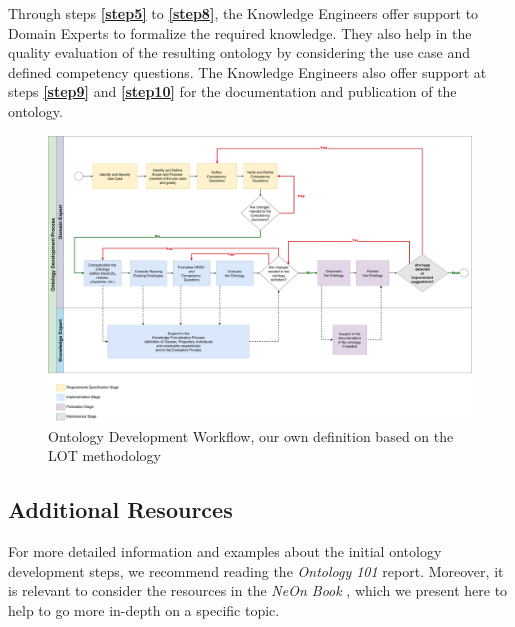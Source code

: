\documentclass{guideline/sty/rapport}
\begin{document}
\begin{beware}[Remark]
Through steps \textbf{\ref{step5}} to \textbf{\ref{step8}}, the Knowledge Engineers offer support to Domain Experts to formalize the required knowledge. They also help in the quality evaluation of the resulting ontology by considering the use case and defined competency questions.
The Knowledge Engineers also offer support at steps \textbf{\ref{step9}} and \textbf{\ref{step10}} for the documentation and publication of the ontology.
\end{beware}


\begin{figure}
    \centering
      \includegraphics[width=1\textwidth]{images/adaptedworkflow.pdf}
      \caption{Ontology Development Workflow, our own definition based on the LOT methodology \cite{Poveda22}}
    \label{fig:workflowsuggestion}
\end{figure}

\subsection{Additional Resources} \label{sec:additionalresources}
For more detailed information and examples about the initial ontology development steps, we recommend reading the \textit{Ontology 101} report. Moreover, it is relevant to consider the resources in the \textit{NeOn Book} \cite{Perez08}, which we present here to help to go more in-depth on a specific topic.
\end{document}
